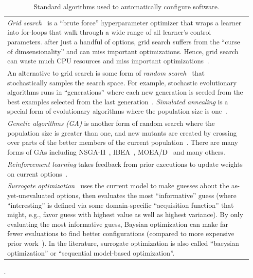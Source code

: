 \documentclass{NSF}
\begin{document}
\begin{nsfdescription}
\begin{table}[!htbp]
\begin{tabular}{|p{.99\linewidth}|}
\textit{Grid search}~\cite{bergstra2011algorithms, tantithamthavorn2016automated} is a ``brute force'' hyperparameter optimizer that wraps a learner into for-loops that walk through a wide range of all learner's control parameters.   after just a  handful of options, grid search suffers from the ``curse of dimsensionality'' and can miss important optimizations. Hence, grid search can waste much CPU resources and miss important optimizations~\cite{bergstra2012random}.\\
 \rowcolor{blue!10}
An alternative to grid search is some form of \textit{random search}~\cite{bergstra2012random} that stochastically samples the search space. For example,
stochastic evolutionary algorithms  runs in ``generations'' where each new generation is seeded from the best examples selected from the last generation~\cite{goldberg2006genetic}. {\em Simulated annealing} is a special form of evolutionary algorithms where the population size is one~\cite{kirkpatrick1983optimization,Menzies:2007a}. 
\\
\textit{Genetic algorithms (GA)} is another form of random search where the population size is greater than one, and new mutants are created by crossing over parts of the better members of the current population~\cite{goldberg2006genetic,Panichella:2013}.
There are many forms of GAs including NSGA-II~\cite{deb2002fast}, IBEA~\cite{zitzler2004indicator}, MOEA/D~\cite{zhang2007moea} and many others.
\\\rowcolor{blue!10}
{\em Reinforcement learning}  takes feedback from prior executions to update  weights on current options~\cite{DBLP:journals/corr/abs-1902-06583,sutton2018reinforcement,Li:2017}. 
\\  
{\em Surrogate optimization}~\cite{alipourfard2017cherrypick, snoek2012practical,brochu2010tutorial}
uses the current model to make guesses about the as-yet-unevaluated options\cite{eggensperger2013towards}, then evaluates the most ``informative'' guess (where ``interesting'' is defined via some  domain-specific ``acquisition function''
that might, e.g., favor guess with highest value as well as highest variance).
By only evaluating the most informative guess, Baysian optimization can 
make far fewer evaluations to find better configurations (compared to more expensive prior work~\cite{guo2013variability, sarkar2015cost, nair2018finding, nair2017using}).
In the literature, surrogate optimization is also called ``baeysian optimization'' or
``sequential model-based optimization''.
\\\hline
\end{tabular}
\caption{Standard algorithms used to automatically configure software.}.\label{tbl:egconfig}
\end{table}


\end{nsfdescription}
\end{document}
